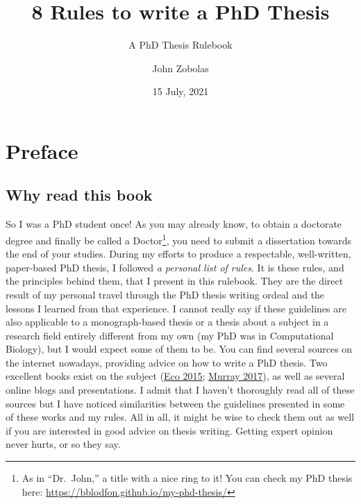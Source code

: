 \documentclass[
  12pt,
]{book}
\title{8 Rules to write a PhD Thesis}
\subtitle{A PhD Thesis Rulebook}
\author{John Zobolas}
\date{15 July, 2021}
\begin{document}
\maketitle

{
\hypersetup{linkcolor=}
\setcounter{tocdepth}{1}
\tableofcontents
}
\hypertarget{preface}{%
\chapter*{Preface}\label{preface}}

\hypertarget{why-read-this-book}{%
\section*{Why read this book}\label{why-read-this-book}}

So I was a PhD student once!
As you may already know, to obtain a doctorate degree and finally be called a Doctor\footnote{As in ``Dr.~John,'' a title with a nice ring to it! You can check my PhD thesis here: \url{https://bblodfon.github.io/my-phd-thesis/}}, you need to submit a dissertation towards the end of your studies.
During my efforts to produce a respectable, well-written, paper-based PhD thesis, I followed \emph{a personal list of rules}.
It is these rules, and the principles behind them, that I present in this rulebook.
They are the direct result of my personal travel through the PhD thesis writing ordeal and the lessons I learned from that experience.
I cannot really say if these guidelines are also applicable to a monograph-based thesis or a thesis about a subject in a research field entirely different from my own (my PhD was in Computational Biology), but I would expect some of them to be.
You can find several sources on the internet nowadays, providing advice on how to write a PhD thesis.
Two excellent books exist on the subject (\protect\hyperlink{ref-Eco2015}{Eco 2015}; \protect\hyperlink{ref-Murray2017}{Murray 2017}), as well as several online blogs and presentations.
I admit that I haven't thoroughly read all of these sources but I have noticed similarities between the guidelines presented in some of these works and my rules.
All in all, it might be wise to check them out as well if you are interested in good advice on thesis writing.
Getting expert opinion never hurts, or so they say.
\end{document}
